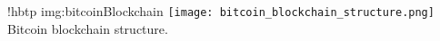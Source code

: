 \namedfigure
{!hbtp}
{img:bitcoinBlockchain}
{\texttt{[image: bitcoin\_blockchain\_structure.png]}}
{Bitcoin blockchain structure.}
